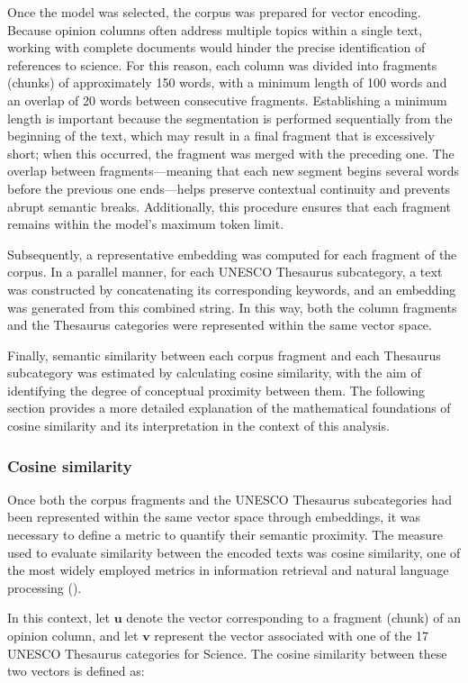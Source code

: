 \documentclass[11pt,a4paper]{article}
\begin{document}
Once the model was selected, the corpus was prepared for vector encoding. Because opinion columns often address multiple topics within a single text, working with complete documents would hinder the precise identification of references to science. For this reason, each column was divided into fragments (chunks) of approximately 150 words, with a minimum length of 100 words and an overlap of 20 words between consecutive fragments. Establishing a minimum length is important because the segmentation is performed sequentially from the beginning of the text, which may result in a final fragment that is excessively short; when this occurred, the fragment was merged with the preceding one. The overlap between fragments—meaning that each new segment begins several words before the previous one ends—helps preserve contextual continuity and prevents abrupt semantic breaks. Additionally, this procedure ensures that each fragment remains within the model’s maximum token limit.

Subsequently, a representative embedding was computed for each fragment of the corpus. In a parallel manner, for each UNESCO Thesaurus subcategory, a text was constructed by concatenating its corresponding keywords, and an embedding was generated from this combined string. In this way, both the column fragments and the Thesaurus categories were represented within the same vector space.

Finally, semantic similarity between each corpus fragment and each Thesaurus subcategory was estimated by calculating cosine similarity, with the aim of identifying the degree of conceptual proximity between them. The following section provides a more detailed explanation of the mathematical foundations of cosine similarity and its interpretation in the context of this analysis.

	
	\subsubsection{Cosine similarity}
	
	Once both the corpus fragments and the UNESCO Thesaurus subcategories had been represented within the same vector space through embeddings, it was necessary to define a metric to quantify their semantic proximity. The measure used to evaluate similarity between the encoded texts was cosine similarity, one of the most widely employed metrics in information retrieval and natural language processing (\cite{Jurafsky2025}).
	
	In this context, let $\mathbf{u}$ denote the vector corresponding to a fragment (chunk) of an opinion column, and let $\mathbf{v}$ represent the vector associated with one of the 17 UNESCO Thesaurus categories for Science. The cosine similarity between these two vectors is defined as:
		
\end{document}
